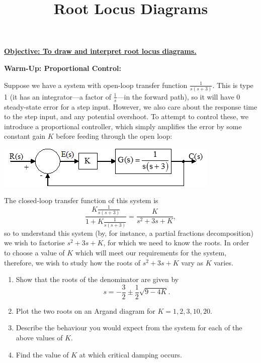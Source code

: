 \documentclass{article}
\begin{document}
\title{Root Locus Diagrams}
\date{}

\maketitle
\thispagestyle{empty}

\Large

\vskip -10mm

\textbf{\underline{Objective: To draw and interpret root locus diagrams.}}








\vspace{5mm}






\textbf{Warm-Up: Proportional Control:}\bigskip

Suppose we have a system with open-loop transfer function $\frac{1}{s(s+3)}$. This is type 1 (it has an integrator---a factor of $\frac{1}{s}$---in the forward path), so it will have 0 steady-state error for a step input. However, we also care about the response time to the step input, and any potential overshoot. To attempt to control these, we introduce a proportional controller, which simply amplifies the error by some constant gain $K$ before feeding through the open loop:
\begin{center}
\includegraphics{P-control.jpg}
\end{center}

The closed-loop transfer function of this system is
\[\frac{K\frac{1}{s(s+3)}}{1+K\frac{1}{s(s+3)}}=\frac{K}{s^2+3s+K},\]
so to understand this system (by, for instance, a partial fractions decomposition) we wish to factorise $s^2+3s+K$, for which we need to know the roots. In order to choose a value of $K$ which will meet our requirements for the system, therefore, we wish to study how the roots of $s^2+3s+K$ vary as $K$ varies.

\begin{enumerate}
	\item Show that the roots of the denominator are given by
		\[s=-\frac{3}{2}\pm \frac{1}{2}\sqrt{9-4K}.\]
	\item Plot the two roots on an Argand diagram for $K=1,2,3,10,20$.
	\item Describe the behaviour you would expect from the system for each of the above values of $K$.
	\item Find the value of $K$ at which critical damping occurs.
\end{enumerate}
\end{document}
